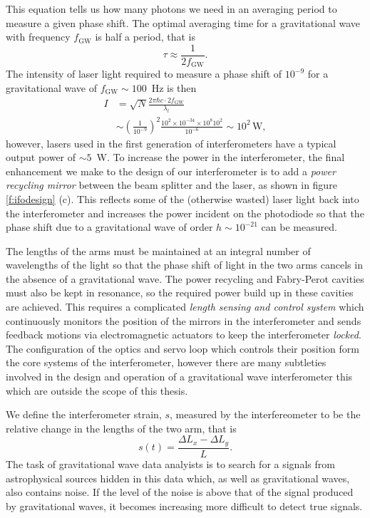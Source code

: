 This equation tells us how many photons we need in an averaging period to
measure a given phase shift. The optimal averaging time for a gravitational
wave with frequency $f_\mathrm{GW}$ is half a period, that is
\begin{equation}
\tau \approx \frac{1}{2 f_\mathrm{GW}}.
\end{equation}
The intensity of laser light required to measure a phase shift of $10^{-9}$
for a gravitational wave of $f_\mathrm{GW} \sim 100$~Hz is then
\begin{equation}
\begin{split}
I &= \sqrt{N} \frac{2 \pi \hbar c \cdot 2f_\mathrm{GW}}{\lambda_l} \\
&\sim \left(\frac{1}{10^{-9}}\right)^2 
\frac{10^2 \times 10^{-34} \times 10^{8} 10^2 } { 10^{-6} } \sim 10^2\,
\mathrm{W},
\end{split}
\end{equation}
however, lasers used in the first generation of interferometers have a typical
output power of $\sim 5$~W. To increase the power in the interferometer, the
final enhancement we make to the design of our interferometer is to add a
\emph{power recycling mirror} between the beam splitter and the laser, as
shown in figure \ref{f:ifodesign} (c). This reflects some of the (otherwise
wasted) laser light back into the interferometer and increases the power
incident on the photodiode so that the phase shift due to a gravitational wave
of order $h \sim 10^{-21}$ can be measured.

The lengths of the arms must be maintained at an integral number of
wavelengths of the light so that the phase shift of light in the two arms
cancels in the absence of a gravitational wave. The power recycling and
Fabry-Perot cavities must also be kept in resonance, so the required power
build up in these cavities are achieved. This requires a complicated
\emph{length sensing and control system}\cite{Fritschel:2001} which
continuously monitors the position of the mirrors in the interferometer and
sends feedback motions via electromagnetic actuators to keep the
interferometer \emph{locked}. The configuration of the optics and servo loop
which controls their position form the core systems of the interferometer,
however there are many subtleties involved in the design and operation of a
gravitational wave interferometer this which are outside the scope of this
thesis.

We define the interferometer strain, $s$, measured by the interfereometer
to be the relative change in the lengths of the two arm, that is
\begin{equation}
s(t) = \frac{\Delta L_x - \Delta L_y}{L}.
\end{equation}
The task of gravitational wave data analyists is to search for a signals from
astrophysical sources hidden in this data which, as well as gravitational
waves, also contains noise. If the level of the noise is above that of the
signal produced by gravitational waves, it becomes increasing more difficult
to detect true signals.

